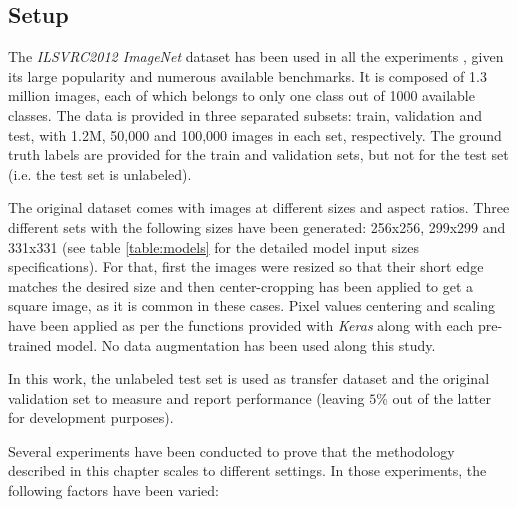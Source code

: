 \subsection{Setup}
 The \textit{ILSVRC2012 ImageNet} dataset has been used in all the experiments \autocite{ILSVRC15}, given its large popularity and numerous available benchmarks. It is composed of 1.3 million images,  each of which belongs to only one class out of 1000 available classes. The data is provided in three separated subsets: train, validation and test, with 1.2M, 50,000 and 100,000 images in each set, respectively. The ground truth labels are provided for the train and validation sets, but not for the test set (i.e. the test set is unlabeled).

 The original dataset comes with images at different sizes and aspect ratios. Three different sets with the following sizes have been generated: 256x256, 299x299 and 331x331 (see table \ref{table:models} for the detailed model input sizes specifications). For that, first the images were resized so that their short edge matches the desired size and then center-cropping has been applied to get a square image, as it is common in these cases. Pixel values centering and scaling have been applied as per the functions provided with \textit{Keras} along with each pre-trained model. No data augmentation has been used along this study.

 In this work, the unlabeled test set is used as transfer dataset and the original validation set to measure and report performance (leaving $5\%$ out of the latter for development purposes).

Several experiments have been conducted to prove that the methodology described in this chapter scales to different settings. In those experiments, the following factors have been varied:

